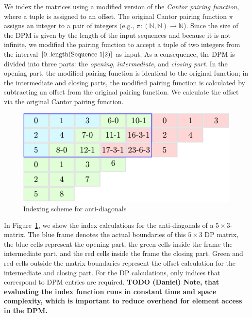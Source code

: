 \documentclass[runningheads,a4paper]{llncs}
\begin{document}
We index the matrices using a modified version of the \textit{Cantor pairing function}, where a tuple is assigned to an offset. 
The original Cantor pairing function $\pi$ assigns an integer to a pair of integers (e.g., $\pi: (\mathbb{N}, \mathbb{N}) \rightarrow \mathbb{N}$). 
Since the size of the DPM is given by the length of the input sequences and because it is not infinite, 
we modified the pairing function to accept a tuple of two integers from the interval $[0..\textrm{length}(\textrm{Sequence 1\textbar2})]$ as input. 
As a consequence, the DPM is divided into three parts: the \emph{opening}, \emph{intermediate}, and \emph{closing part}. 
In the opening part, the modified pairing function is identical to the original function; in the intermediate and closing parts, 
the modified pairing function is calculated by subtracting an offset from the original pairing function. 
We calculate the offset via the original Cantor pairing function.

\begin{figure}[ht!]
  \centering
  \includegraphics[scale=0.9]{figures/pairingfunc.pdf}
  \caption{Indexing scheme for anti-diagonals}
  \label{fig:pairingfunc}
\end{figure}

In Figure~\ref{fig:pairingfunc}, we show the index calculations for the anti-diagonals of a $5\times3$-matrix. 
The blue frame denotes the actual boundaries of this $5\times3$ DP matrix, the blue cells represent the opening part, 
the green cells inside the frame the intermediate part, and the red cells inside the frame the closing part. 
Green and red cells outside the matrix boundaries represent the offset calculation for the intermediate and closing part. 
For the DP calculations, only indices that correspond to DPM entries are required. {\bf TODO (Daniel) Note, that evaluating the index function runs in constant time and space complexity, which is important to reduce overhead for element access in the DPM.}
\end{document}
